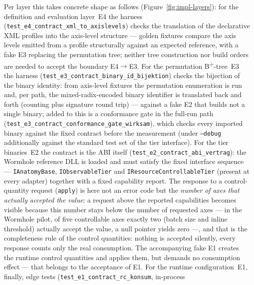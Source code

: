 \begin{nurlang}
Per layer this takes concrete shape as follows (Figure~\ref{fig:impl-layers}): for the definition and
evaluation layer~E4 the harness
(\texttt{test\_\allowbreak{}e4\_\allowbreak{}contract\_\allowbreak{}xml\_\allowbreak{}to\_\allowbreak{}axislevels})
checks the translation of the declarative XML profiles into the axis-level structure --- golden
fixtures compare the axis levels emitted from a profile structurally against an expected reference,
with a fake E3 replacing the permutation tree; neither tree construction nor build orders are needed to
accept the boundary E4$\to$E3. For the permutation B\textsuperscript{+}-tree~E3 the harness
(\texttt{test\_\allowbreak{}e3\_\allowbreak{}contract\_\allowbreak{}binary\_\allowbreak{}id\_\allowbreak{}bijektion})
checks the bijection of the binary identity: from axis-level fixtures the permutation enumeration is
run and, per path, the mixed-radix-encoded binary identifier is translated back and forth (counting
plus signature round trip) --- against a fake E2 that builds not a single binary; added to this is a
conformance gate in the full-run path
(\texttt{test\_\allowbreak{}e3\_\allowbreak{}contract\_\allowbreak{}conformance\_\allowbreak{}gate\_\allowbreak{}wirksam}),
which checks every imported binary against the fixed contract before the measurement (under
\texttt{--debug} additionally against the standard test set of the tier interface). For the tier
binaries~E2 the contract is the ABI itself
(\texttt{test\_\allowbreak{}e2\_\allowbreak{}contract\_\allowbreak{}abi\_\allowbreak{}vertrag}): the
Wormhole reference DLL is loaded and must satisfy the fixed interface sequence ---
\texttt{IAnatomyBase}, \texttt{IObservableTier} and \texttt{IResourceControllableTier} (present at every
adapter) together with a fixed capability report. The response to a control-quantity request
(\texttt{apply}) is here not an error code but the \emph{number of axes that actually accepted the
value}: a request above the reported capabilities becomes visible because this number stays below the
number of requested axes --- in the Wormhole pilot, of five controllable axes exactly two (batch size
and inline threshold) actually accept the value, a null pointer yields zero ---, and that is the
completeness rule of the control quantities: nothing is accepted silently, every response counts only
the real consumption. The accompanying fake E1 creates the runtime control quantities and applies them,
but demands no consumption effect --- that belongs to the acceptance of E1. For the runtime
configuration~E1, finally, edge tests
(\texttt{test\_\allowbreak{}e1\_\allowbreak{}contract\_\allowbreak{}rc\_\allowbreak{}konsum}, in-process

\end{nurlang}
